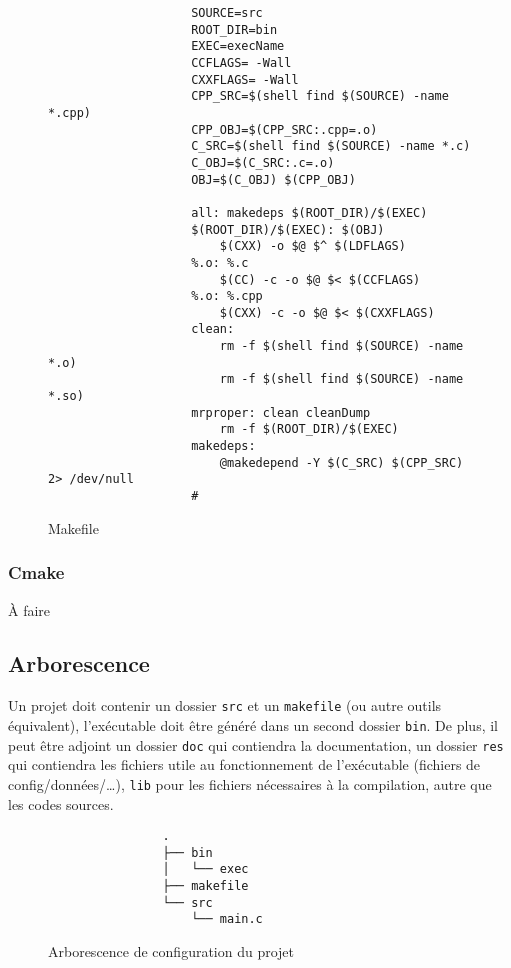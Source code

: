 			\begin{figure}[H]
				\begin{changemargin}{-2.5cm}{-2.5cm}
				\begin{tcolorbox}
				\begin{verbatim}
					SOURCE=src
					ROOT_DIR=bin
					EXEC=execName
					CCFLAGS= -Wall
					CXXFLAGS= -Wall
					CPP_SRC=$(shell find $(SOURCE) -name *.cpp)
					CPP_OBJ=$(CPP_SRC:.cpp=.o)
					C_SRC=$(shell find $(SOURCE) -name *.c)
					C_OBJ=$(C_SRC:.c=.o)
					OBJ=$(C_OBJ) $(CPP_OBJ)

					all: makedeps $(ROOT_DIR)/$(EXEC)
					$(ROOT_DIR)/$(EXEC): $(OBJ)
					    $(CXX) -o $@ $^ $(LDFLAGS)
					%.o: %.c
					    $(CC) -c -o $@ $< $(CCFLAGS)
					%.o: %.cpp
					    $(CXX) -c -o $@ $< $(CXXFLAGS)
					clean:
					    rm -f $(shell find $(SOURCE) -name *.o)
					    rm -f $(shell find $(SOURCE) -name *.so)
					mrproper: clean cleanDump
					    rm -f $(ROOT_DIR)/$(EXEC)
					makedeps:
					    @makedepend -Y $(C_SRC) $(CPP_SRC) 2> /dev/null
				    #
				\end{verbatim}
				\end{tcolorbox}
				\end{changemargin}
				\caption{Makefile}
			\end{figure}

		\subsubsection{Cmake}
			À faire

	\subsection{Arborescence}
		Un projet doit contenir un dossier \verb+src+ et un \verb+makefile+ (ou autre outils équivalent), l'exécutable doit être généré dans un second dossier \verb+bin+. De plus, il peut être adjoint un dossier \verb+doc+ qui contiendra la documentation, un dossier \verb+res+ qui contiendra les fichiers utile au fonctionnement de l’exécutable (fichiers de config/données/\dots), \verb+lib+ pour les fichiers nécessaires à la compilation, autre que les codes sources.

		\begin{figure}[H]
			\begin{changemargin}{-2.5cm}{-2.5cm}
			\begin{tcolorbox}
			\begin{verbatim}
				.
				├── bin
				│   └── exec
				├── makefile
				└── src
				    └── main.c
			\end{verbatim}
			\end{tcolorbox}
			\end{changemargin}
			\caption{Arborescence de configuration du projet}
		\end{figure}

